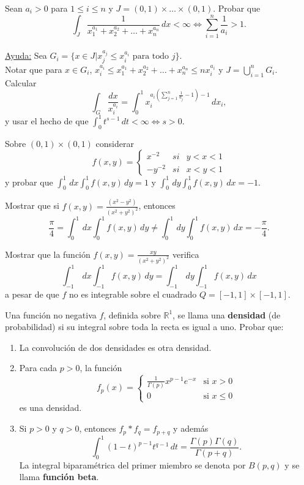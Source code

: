 \documentclass{book}
\newcommand{\rr}{\mathbb{R}}
\begin{document}
\begin{ejer}{}
 Sean $a_i>0$ para $1\leq i \leq n$ y $J=(0,1)\times \ldots \times (0,1)$.
Probar que 
\[
\int_J  \frac{1}{x_1^{a_1}+x_2^{a_2}+\ldots+x_n^{a_n}}\,dx<\infty 
\Leftrightarrow
\sum\limits_{i=1}^{n}\frac{1}{a_i}>1.
\]
\\
\underline{Ayuda:}
Sea $G_i=\{x \in J | x_j^{a_j} \leq x_i^{a_i} \mbox{ para todo  } j \}$. \\
Notar que para $x \in G_i$, $x_i^{a_i}\leq x_1^{a_1}+x_2^{a_2}+\ldots+x_n^{a_n}\leq n x_i^{a_i}$
y $J=\bigcup\limits_{i=1}^{n} G_i$. \\
Calcular 
\[
\int_G \frac{dx}{x_i^{a_i}}=\int_0^1 x_i ^{a_i\left(\sum\limits_{j=1}^n \frac{1}{a_j}-1\right)-1}\,dx_i,
\]
y usar el hecho de que $\int_0^1 t^{s-1}\,dt<\infty \Leftrightarrow s>0$.
\end{ejer}


\begin{ejer}{}
Sobre $(0,1)\times (0,1)$ considerar
\[
f(x,y)=\left\{
\begin{array}{rll}
x^{-2}&si&y<x<1
\\
-y^{-2}&si&x<y<1
\end{array}
\right.
\]
y probar que $\int_0^1\,dx\int_0^1 f(x,y)\,dy=1$ y $\int_0^1\,dy \int_0^1 f(x,y)\,dx=-1$.
\end{ejer}

\begin{ejer}{}
 Mostrar que si $f(x,y)=\frac{(x^2-y^2)}{(x^2+y^2)^2}$, entonces
     $$\frac{\pi}{4}=\int_0^1 \,dx\int_0^1 f(x,y)\,dy\not = \int_0^1\,dy \int_0^1 f(x,y)\,dx=-\frac{\pi}{4}. $$
\end{ejer}

 \begin{ejer}{} Mostrar que la función $f(x,y)=\frac{xy}{(x^2+y^2)^2}$ verifica
   $$\int_{-1}^1 \,dx\int_{-1}^1 f(x,y)\,dy=\int_{-1}^1\,dy \int_{-1}^1 f(x,y)\,dx $$
   a pesar de que $f$ no es integrable sobre el cuadrado $Q=[-1,1]\times [-1,1]$.
	\end{ejer}

 
\begin{ejer}{} Una función no negativa $f$, definida sobre $\rr^1$, se llama una {\bf{densidad}}
   (de probabilidad) si su integral sobre toda la recta es igual a uno. Probar que: 
	\begin{enumerate}
	\item La convolución de dos densidades es otra densidad.
	\item Para cada $p>0$, la función 
     $$f_p(x)=\left\{ 
      \begin{array}{cc}
      \frac{1}{\Gamma(p)} x^{p-1} e^{-x} & \mbox{si $x>0$}\\
      0 & \mbox{si $x \leq 0$}
      \end{array}
      \right. $$
      es una densidad.
	 \item Si $p>0$ y $q>0$, entonces $f_p*f_q=f_{p+q}$ y además
      $$\int_0^1 (1-t)^{p-1} t^{q-1}\,dt=\frac{\Gamma(p) \Gamma(q)}{\Gamma(p+q)}. $$
      La integral biparamétrica del primer miembro se denota por $B(p,q)$ y se llama 
      {\bf{función beta}}.
	\end{enumerate}
	
\end{ejer}

	


\end{document}
